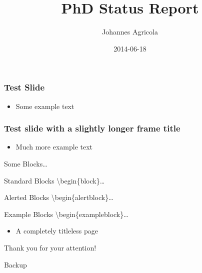 \documentclass[10pt]{beamer}
\title{PhD Status Report}
\date{2014-06-18}
\author[Johannes Agricola]{Johannes Agricola}
\begin{document}
\begin{frame}
  \titlepage
\end{frame}

\begin{frame}
  \frametitle{Test Slide}

  \begin{itemize}
    \item 
      Some example text
  \end{itemize}
\end{frame}

\begin{frame}
  \frametitle{Test slide with a slightly longer frame title}

  \begin{itemize}
    \item 
      Much more example text
  \end{itemize}
\end{frame}

\begin{frame}{Some Blocks\ldots}
  \begin{block}{Standard Blocks}
    \textbackslash{}begin\{block\}\ldots
  \end{block}
  \begin{alertblock}{Alerted Blocks}
    \textbackslash{}begin\{alertblock\}\ldots
  \end{alertblock}
  \begin{exampleblock}{Example Blocks}
    \textbackslash{}begin\{exampleblock\}\ldots
  \end{exampleblock}
\end{frame}

\begin{frame}
  \begin{itemize}
    \item 
      A completely titleless page
  \end{itemize}
\end{frame}

\setcounter{finalframe}{\value{framenumber}}
\begin{frame}
  \begin{center}
    \Huge Thank you for your attention!
  \end{center}
\end{frame}

\appendix
\begin{frame}
  \begin{center}
    \Huge Backup
  \end{center}
\end{frame}

\setcounter{framenumber}{\value{finalframe}}
\end{document}
